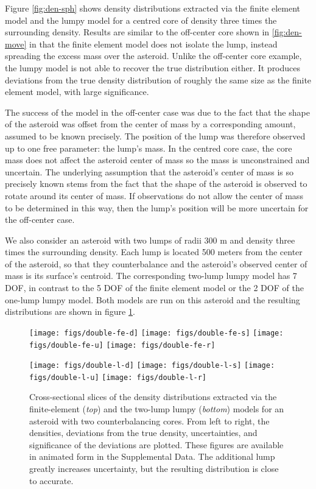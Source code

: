 \documentclass[fleqn,usenatbib]{mnras}
\begin{document}
Figure \ref{fig:den-sph} shows density distributions extracted via the finite element model and the lumpy model for a centred core of density three times the surrounding density. Results are similar to the off-center core shown in \ref{fig:den-move} in that the finite element model does not isolate the lump, instead spreading the excess mass over the asteroid. Unlike the off-center core example, the lumpy model is not able to recover the true distribution either. It produces deviations from the true density distribution of roughly the same size as the finite element model, with large significance.

The success of the model in the off-center case was due to the fact that the shape of the asteroid was offset from the center of mass by a corresponding amount, assumed to be known precisely. The position of the lump was therefore observed up to one free parameter: the lump's mass. In the centred core case, the core mass does not affect the asteroid center of mass so the mass is unconstrained and uncertain. The underlying assumption that the asteroid's center of mass is so precisely known stems from the fact that the shape of the asteroid is observed to rotate around its center of mass. If observations do not allow the center of mass to be determined in this way, then the lump's position will be more uncertain for the off-center case.

We also consider an asteroid with two lumps of radii 300 m and density three times the surrounding density. Each lump is located 500 meters from the center of the asteroid, so that they counterbalance and the asteroid's observed center of mass is its surface's centroid. The corresponding two-lump lumpy model has 7 DOF, in contrast to the 5 DOF of the finite element model or the 2 DOF of the one-lump lumpy model. Both models are run on this asteroid and the resulting distributions are shown in figure \ref{fig:den-double}.

\begin{figure}
  \texttt{[image: figs/double-fe-d]}\hfill
  \texttt{[image: figs/double-fe-s]}\hfill
  \texttt{[image: figs/double-fe-u]}\hfill
  \texttt{[image: figs/double-fe-r]}
  
  \texttt{[image: figs/double-l-d]}\hfill
  \texttt{[image: figs/double-l-s]}\hfill
  \texttt{[image: figs/double-l-u]}\hfill
  \texttt{[image: figs/double-l-r]}

  \caption{Cross-sectional slices of the density distributions extracted via the finite-element (\textit{top}) and the two-lump lumpy (\textit{bottom}) models for an asteroid with two counterbalancing cores. From left to right, the densities, deviations from the true density, uncertainties, and significance of the deviations are plotted. These figures are available in animated form in the Supplemental Data. The additional lump greatly increases uncertainty, but the resulting distribution is close to accurate.}
  \label{fig:den-double}
\end{figure}
\end{document}
